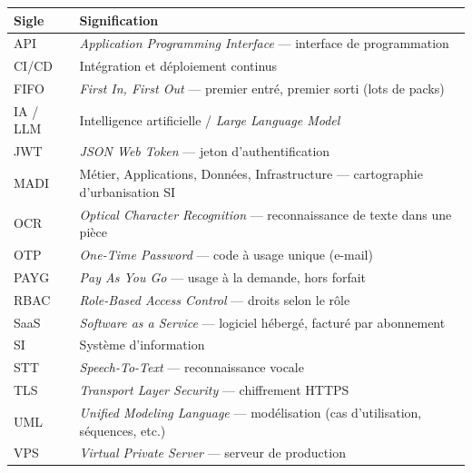 \begin{table}[H]
\centering
\small
\begin{tabular}{@{}lp{10.6cm}@{}}
\toprule
\textbf{Sigle} & \textbf{Signification} \\
\midrule
API & \textit{Application Programming Interface} --- interface de programmation \\
CI/CD & Intégration et déploiement continus \\
FIFO & \textit{First In, First Out} --- premier entré, premier sorti (lots de packs) \\
IA / LLM & Intelligence artificielle / \textit{Large Language Model} \\
JWT & \textit{JSON Web Token} --- jeton d'authentification \\
MADI & Métier, Applications, Données, Infrastructure --- cartographie d'urbanisation SI \\
OCR & \textit{Optical Character Recognition} --- reconnaissance de texte dans une pièce \\
OTP & \textit{One-Time Password} --- code à usage unique (e-mail) \\
PAYG & \textit{Pay As You Go} --- usage à la demande, hors forfait \\
RBAC & \textit{Role-Based Access Control} --- droits selon le rôle \\
SaaS & \textit{Software as a Service} --- logiciel hébergé, facturé par abonnement \\
SI & Système d'information \\
STT & \textit{Speech-To-Text} --- reconnaissance vocale \\
TLS & \textit{Transport Layer Security} --- chiffrement HTTPS \\
UML & \textit{Unified Modeling Language} --- modélisation (cas d'utilisation, séquences, etc.) \\
VPS & \textit{Virtual Private Server} --- serveur de production \\
\bottomrule
\end{tabular}
\end{table}

\clearpage
\tableofcontents
\clearpage
{}
\listoffigures
\clearpage
{}
\listoftables
